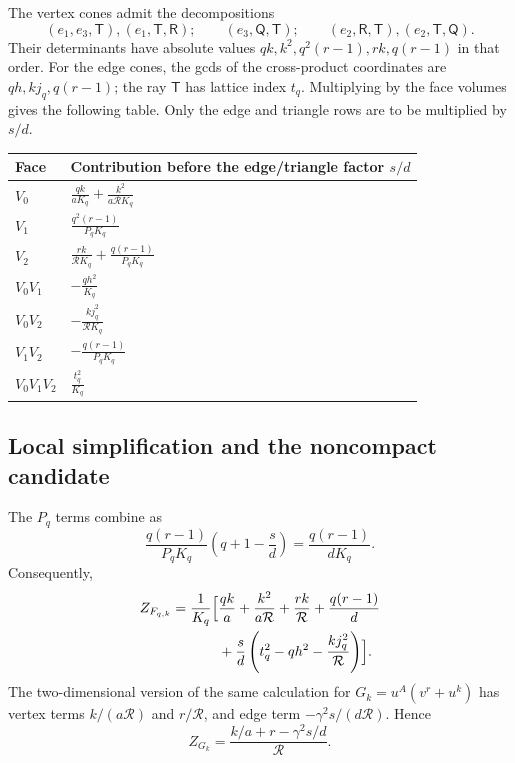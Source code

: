 \documentclass[11pt]{article}
\numberwithin{equation}{section}
\theoremstyle{definition}
\theoremstyle{remark}
\begin{document}
The vertex cones admit the decompositions
\[
 (e_1,e_3,\mathsf T),(e_1,\mathsf T,\mathsf R);\qquad
 (e_3,\mathsf Q,\mathsf T);\qquad
 (e_2,\mathsf R,\mathsf T),(e_2,\mathsf T,\mathsf Q).
\]
Their determinants have absolute values
$qk,k^2,q^2(r-1),rk,q(r-1)$ in that order.
For the edge cones, the gcds of the cross-product
coordinates are $qh,kj_q,q(r-1)$; the ray $\mathsf T$
has lattice index $t_q$. Multiplying by the face
volumes gives the following table. Only the edge
and triangle rows are to be multiplied by $s/d$.
\begin{center}
\renewcommand{\arraystretch}{1.5}
\begin{tabular}{@{}ll@{}}
\toprule
Face & Contribution before the edge/triangle factor $s/d$\\
\midrule
$V_0$ & $\displaystyle\frac{qk}{aK_q}
                       +\frac{k^2}{a\mathcal R K_q}$\\
$V_1$ & $\displaystyle\frac{q^2(r-1)}{P_qK_q}$\\
$V_2$ & $\displaystyle\frac{rk}{\mathcal R K_q}
                       +\frac{q(r-1)}{P_qK_q}$\\
$V_0V_1$ & $\displaystyle-\frac{qh^2}{K_q}$\\
$V_0V_2$ & $\displaystyle-\frac{kj_q^2}{\mathcal R K_q}$\\
$V_1V_2$ & $\displaystyle-\frac{q(r-1)}{P_qK_q}$\\
$V_0V_1V_2$ & $\displaystyle\frac{t_q^2}{K_q}$\\
\bottomrule
\end{tabular}
\end{center}

\subsection{Local simplification and the noncompact candidate}

The $P_q$ terms combine as
\[
 \frac{q(r-1)}{P_qK_q}\left(q+1-\frac{s}{d}\right)
          =\frac{q(r-1)}{dK_q}.
\]
Consequently,
\begin{equation}\label{eq:local-F}
 \begin{split}
 Z_{F_{q,k}}=\frac1{K_q}\Bigl[{}&
       \frac{qk}{a}+\frac{k^2}{a\mathcal R}
       +\frac{rk}{\mathcal R}+\frac{q(r-1)}d\\
       &+\frac{s}{d}\left(t_q^2-qh^2
                          -\frac{kj_q^2}{\mathcal R}\right)\Bigr].
 \end{split}
\end{equation}
The two-dimensional version of the same calculation
for $G_k=u^A(v^r+u^k)$ has vertex terms
$k/(a\mathcal R)$ and $r/\mathcal R$, and edge term
$-\gamma^2s/(d\mathcal R)$. Hence
\begin{equation}\label{eq:local-G}
 Z_{G_k}=\frac{k/a+r-\gamma^2s/d}{\mathcal R}.
\end{equation}
\end{document}
